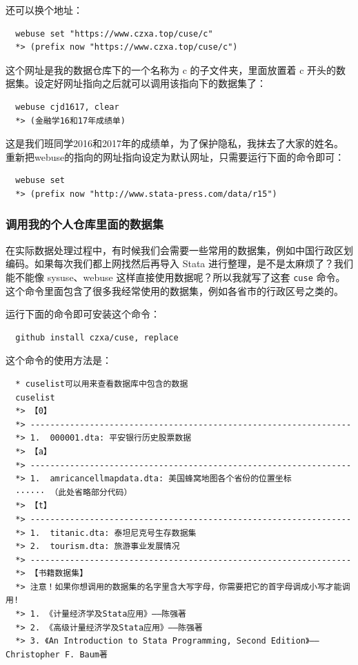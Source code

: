\documentclass[cn,fancy,blue,11pt]{elegantbook}
\begin{document}
还可以换个地址：

\begin{lstlisting}
  webuse set "https://www.czxa.top/cuse/c"
  *> (prefix now "https://www.czxa.top/cuse/c")
\end{lstlisting}

这个网址是我的数据仓库下的一个名称为 c 的子文件夹，里面放置着 c 开头的数据集。设定好网址指向之后就可以调用该指向下的数据集了：

\begin{lstlisting}
  webuse cjd1617, clear
  *> (金融学16和17年成绩单)
\end{lstlisting}

这是我们班同学2016和2017年的成绩单，为了保护隐私，我抹去了大家的姓名。
重新把webuse的指向的网址指向设定为默认网址，只需要运行下面的命令即可：

\begin{lstlisting}
  webuse set
  *> (prefix now "http://www.stata-press.com/data/r15")
\end{lstlisting}

\subsubsection{调用我的个人仓库里面的数据集}
在实际数据处理过程中，有时候我们会需要一些常用的数据集，例如中国行政区划编码。如果每次我们都上网找然后再导入 Stata 进行整理，是不是太麻烦了？我们能不能像 sysuse、webuse 这样直接使用数据呢？所以我就写了这套 \lstinline{cuse} 命令。这个命令里面包含了很多我经常使用的数据集，例如各省市的行政区号之类的。

运行下面的命令即可安装这个命令：

\begin{lstlisting}
  github install czxa/cuse, replace
\end{lstlisting}

这个命令的使用方法是：

\begin{lstlisting}
  * cuselist可以用来查看数据库中包含的数据
  cuselist
  *> 【0】
  *> -----------------------------------------------------------------
  *> 1.  000001.dta: 平安银行历史股票数据
  *> 【a】
  *> -----------------------------------------------------------------
  *> 1.  amricancellmapdata.dta: 美国蜂窝地图各个省份的位置坐标
  ······ （此处省略部分代码）
  *> 【t】
  *> -----------------------------------------------------------------
  *> 1.  titanic.dta: 泰坦尼克号生存数据集
  *> 2.  tourism.dta: 旅游事业发展情况
  *> -----------------------------------------------------------------
  *> 【书籍数据集】
  *> 注意！如果你想调用的数据集的名字里含大写字母，你需要把它的首字母调成小写才能调用!
  *> 1. 《计量经济学及Stata应用》——陈强著
  *> 2. 《高级计量经济学及Stata应用》——陈强著
  *> 3. 《An Introduction to Stata Programming, Second Edition》——Christopher F. Baum著
\end{lstlisting}
\end{document}
